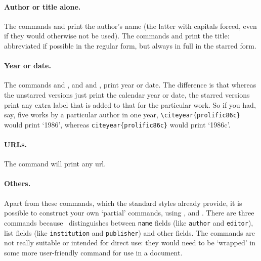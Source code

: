 \paragraph{Author or title alone.} The commands  and
 print the author's name (the latter with capitals
forced, even if they would otherwise not be used). The commands
 and  print the title: abbreviated if
possible in the regular form, but always in full in the starred form.

\paragraph{Year or date.} The commands 
and , and  and , print year
or date. The difference is that whereas the unstarred versions just
print the calendar year or date, the starred versions print any extra
label that is added to that for the particular work. So if you had,
say, five works by a particular author in one year,
\verb|\citeyear{prolific86c}| would print `1986', whereas
\verb|citeyear{prolific86c}| would print `1986c'.

\paragraph{URLs.} The  command will print any url.

\paragraph{Others.} Apart from these commands, which the standard
styles already provide, it is possible to construct your own `partial'
commands, using ,  and
. There are three commands because \biblatex\
distinguishes between \verb|name| fields (like \texttt{author} and
\texttt{editor}), list fields (like \texttt{institution} and
\texttt{publisher}) and other fields. The commands are not really
suitable or intended for direct use: they would need to be `wrapped'
in some more user-friendly command for use in a document.

